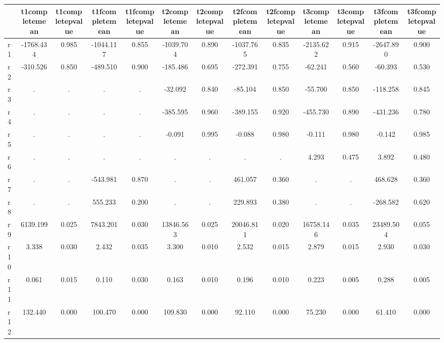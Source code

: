 \begin{table}[htbp]
\begin{tabular}{lcccccccccccc} \hline \hline
 & t1completemean  & t1completepvalue  & t1fcompletemean  & t1fcompletepvalue  & t2completemean  & t2completepvalue  & t2fcompletemean  & t2fcompletepvalue  & t3completemean  & t3completepvalue  & t3fcompletemean  & t3fcompletepvalue  \\  \hline 
r1 & -1768.434 &     0.985 & -1044.117 &     0.855 & -1039.704 &     0.890 & -1037.765 &     0.835 & -2135.622 &     0.915 & -2647.890 &     0.900 \\  
r2 &  -310.526 &     0.850 &  -489.510 &     0.900 &  -185.486 &     0.695 &  -272.391 &     0.755 &   -62.241 &     0.560 &   -60.393 &     0.530 \\  
r3 &         . &         . &         . &         . &   -32.092 &     0.840 &   -85.104 &     0.850 &   -55.700 &     0.850 &  -118.258 &     0.845 \\  
r4 &         . &         . &         . &         . &  -385.595 &     0.960 &  -389.155 &     0.920 &  -455.730 &     0.890 &  -431.236 &     0.780 \\  
r5 &         . &         . &         . &         . &    -0.091 &     0.995 &    -0.088 &     0.980 &    -0.111 &     0.980 &    -0.142 &     0.985 \\  
r6 &         . &         . &         . &         . &         . &         . &         . &         . &     4.293 &     0.475 &     3.892 &     0.480 \\  
r7 &         . &         . &  -543.981 &     0.870 &         . &         . &   461.057 &     0.360 &         . &         . &   468.628 &     0.360 \\  
r8 &         . &         . &   555.233 &     0.200 &         . &         . &   229.893 &     0.380 &         . &         . &  -268.582 &     0.620 \\  
r9 &  6139.199 &     0.025 &  7843.201 &     0.030 & 13846.563 &     0.025 & 20046.811 &     0.020 & 16758.146 &     0.035 & 23489.504 &     0.055 \\  
r10 &     3.338 &     0.030 &     2.432 &     0.035 &     3.300 &     0.010 &     2.532 &     0.015 &     2.879 &     0.015 &     2.930 &     0.030 \\  
r11 &     0.061 &     0.015 &     0.110 &     0.030 &     0.163 &     0.010 &     0.196 &     0.010 &     0.223 &     0.005 &     0.288 &     0.005 \\  
r12 &   132.440 &     0.000 &   100.470 &     0.000 &   109.830 &     0.000 &    92.110 &     0.000 &    75.230 &     0.000 &    61.410 &     0.000 \\  
\hline \hline \end{tabular}
\end{table}
